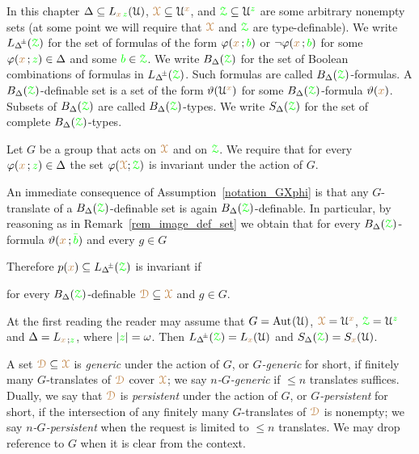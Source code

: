 In this chapter $\Delta\subseteq L_{{\color{brown} x}\,{\color{green} z}}(\EuScript U)$, ${{\color{brown}\EuScript X}}\subseteq\EuScript U^{\color{brown} x}$, and ${{\color{green}\EuScript Z}}\subseteq\EuScript U^{\color{green} z}$ are some arbitrary nonempty sets (at some point we will require that ${\color{brown}\EuScript X}$ and ${\color{green}\EuScript Z}$ are type-definable).
We write $L_{\pmDelta}({\grZ})$ for the set of formulas of the form $\varphi({\color{brown} x}\,;{\color{green} b})$ or $\neg\varphi({\color{brown} x}\,;{\color{green} b})$  for some $\varphi({\color{brown} x}\,;{\color{green} z})\in\Delta$ and some ${\color{green} b}\in{{\color{green}\EuScript Z}}$.
We write $B_\Delta({{\color{green}\EuScript Z}})$ for the set of Boolean combinations of formulas in $L_{\pmDelta}({\grZ})$.
Such formulas are called $B_\Delta({{\color{green}\EuScript Z}})$-formulas.
A $B_\Delta({{\color{green}\EuScript Z}})$-definable set is a set of the form $\vartheta(\EuScript U^{\color{brown} x})$ for some $B_\Delta({{\color{green}\EuScript Z}})$-formula $\vartheta({\color{brown} x})$.
Subsets of $B_\Delta({{\color{green}\EuScript Z}})$ are called $B_\Delta({{\color{green}\EuScript Z}})$-types.
We write $S_\Delta({{\color{green}\EuScript Z}})$ for the set of complete $B_\Delta({{\color{green}\EuScript Z}})$-types.

\begin{assumption}\label{notation_GXphi}
  Let $G$ be a group that acts on ${\color{brown}\EuScript X}$ and on ${\color{green}\EuScript Z}$.
  We require that for every $\varphi({\color{brown} x}\,;{\color{green} z})\in\Delta$ the set $\varphi({\color{brown}\EuScript X};{\color{green}\EuScript Z})$ is invariant under the action of $G$.
\end{assumption}

An immediate consequence of Assumption~\ref{notation_GXphi} is that any $G$-translate of a $B_\Delta({{\color{green}\EuScript Z}})$-definable set is again $B_\Delta({{\color{green}\EuScript Z}})$-definable.
In particular, by reasoning as in Remark~\ref{rem_image_def_set} we obtain that for every $B_\Delta({{\color{green}\EuScript Z}})$-formula $\vartheta({\color{brown} x}\,;{\color{green}\bar b})$ and every $g\in G$


Therefore $p({\mr x})\subseteq L_{\pmDelta}(\grZ)$ is invariant if

\hfill for every $B_\Delta({{\color{green}\EuScript Z}})$-definable ${\color{brown}\EuScript D}\subseteq{\color{brown}\EuScript X}$ and $g\in G$.

At the first reading the reader may assume that $G={\rm Aut\kern.15ex}(\EuScript U)$, ${\color{brown}\EuScript X}=\EuScript U^{\color{brown} x}$, ${\color{green}\EuScript Z}=\EuScript U^{\color{green} z}$ and $\Delta=L_{{\color{brown} x}\,;{\color{green} z}}$, where $|{\color{green} z}|=\omega$.
Then $L_{\pmDelta}(\grZ)=L_{\mr x}(\U)$ and  $S_\Delta({\color{green}\EuScript Z})=S_{\color{brown} x}(\EuScript U)$. 

A set ${\color{brown}\EuScript D}\subseteq{\color{brown}\EuScript X}$ is \emph{generic\/} under the action of $G$, or \emph{$G$-generic\/} for short, if finitely many $G$-translates of ${\color{brown}\EuScript D}$ cover ${\color{brown}\EuScript X}$; we say \emph{$n$-$G$-generic\/} if $\le n$ translates suffices.
Dually, we say that ${\color{brown}\EuScript D}$ is \emph{persistent\/} under the action of $G$, or \emph{$G$-persistent\/} for short, if the intersection of any finitely many $G$-translates of ${\color{brown}\EuScript D}$ is nonempty; we say \emph{$n$-$G$-persistent\/} when the request is limited to $\le n$ translates.
We may drop reference to $G$ when it is clear from the context.

